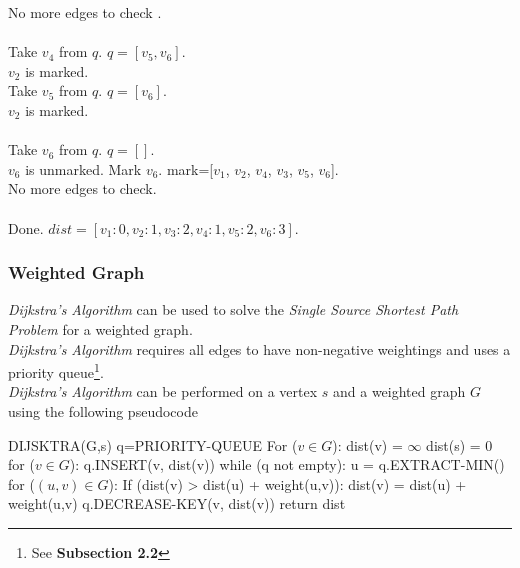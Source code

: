 \documentclass[11pt,a4paper]{article}
\begin{document}
No more edges to check .\\
\\
Take $v_4$ from $q$. $q=[v_5, v_6]$.\\
$v_2$ is marked.\\
Take $v_5$ from $q$. $q=[v_6]$.\\
$v_2$ is marked.\\
\\
Take $v_6$ from $q$. $q=[]$.\\
$v_6$ is unmarked. Mark $v_6$. mark=[$v_1$, $v_2$, $v_4$, $v_3$, $v_5$, $v_6$].\\
No more edges to check.\\
\\
Done. $dist=[v_1:0,v_2:1,v_3:2,v_4:1,v_5:2,v_6:3]$.


\subsubsection{Weighted Graph}

\textit{Dijkstra's Algorithm} can be used to solve the \textit{Single Source Shortest Path Problem} for a weighted graph.\\
\textit{Dijkstra's Algorithm} requires all edges to have non-negative weightings and uses a priority queue\footnote{See \textbf{Subsection 2.2}}.\\

\textit{Dijkstra's Algorithm} can be performed on a vertex $s$ and a weighted graph $G$ using the following pseudocode
\begin{code}
DIJSKTRA(G,s)
q=PRIORITY-QUEUE
For ($v\in G$):
  dist(v) = $\infty$
dist(s) = 0
for ($v\in G$):
  q.INSERT(v, dist(v))
while (q not empty):
  u = q.EXTRACT-MIN()
  for ($(u,v)\in G$):
  If (dist(v) > dist(u) + weight(u,v)):
    dist(v) = dist(u) + weight(u,v)
    q.DECREASE-KEY(v, dist(v))
return dist
\end{code}
\end{document}
